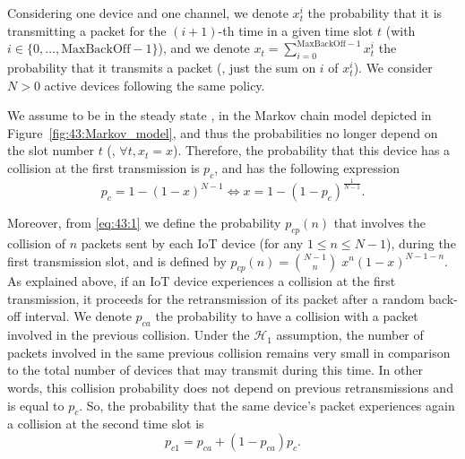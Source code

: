Considering one device and one channel,
we denote $x_t^i$ the probability that it is transmitting a packet for the $(i+1)$-th time in a given time slot $t$ (with $i\in \{0, \dots, \mathrm{MaxBackOff}-1 \}$),
and we denote $x_t = \sum_{i=0}^{\mathrm{MaxBackOff}-1}x_t^i$ the probability that it transmits a packet (\ie, just the sum on $i$ of $x_t^i$).
We consider $N > 0$ active devices following the same policy.

%

We assume to be in the steady state \cite{Norris98}, in the Markov chain model depicted in Figure~\ref{fig:43:Markov_model}, and thus the probabilities no longer depend on the slot number $t$ (\ie, $\forall t, x_t=x$).
Therefore, the probability that this device has a collision at the first transmission is $p_c$, and has the following expression
%
\begin{equation}\label{eq:43:1}
	p_c = 1-\left(1-x\right)^{N-1} \iff x = 1-\left(1-p_c\right)^{\frac{1}{N-1}}.
\end{equation}

Moreover, from \eqref{eq:43:1} we define the probability $p_{cp}(n)$ that involves the collision of $n$ packets sent by each IoT device (for any $1\leq n \leq N-1$), during the first transmission slot, and is defined by $p_{cp}(n) = {N-1 \choose n} \; x^n \left(1-x\right)^{N-1-n}$.
%
As explained above, if an IoT device experiences a collision at the first transmission, it proceeds for the retransmission of its packet after a random back-off interval.
We denote $p_{ca}$ the probability to have a collision with a packet involved in the previous collision.
Under the $\mathcal{H}_{1}$ assumption, the number of packets involved in the same previous collision remains very small in comparison to the total number of devices that may transmit during this time. In other words, this collision probability does not depend on previous retransmissions and is equal to $p_c$.
So, the probability that the same device's packet experiences again a collision at the second time slot is
%
\begin{equation}\label{eq:43:decomppc1}
	p_{c1} = p_{ca}+\left(1-p_{ca} \right)p_c.
\end{equation}


